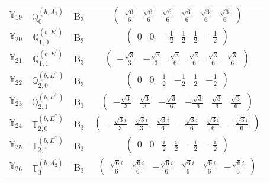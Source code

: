 \documentclass[fleqn,10pt,landscape]{article}
\begin{document}
\begin{itemize}
\begin{center}
\begin{longtable}{c|c|c|c}
$ \mathbb{Y}_{19} $ & $\mathbb{Q}_{0}^{(b,A_{1}^{\prime})}$ & B$_{3}$ & $\begin{pmatrix} \frac{\sqrt{6}}{6} & \frac{\sqrt{6}}{6} & \frac{\sqrt{6}}{6} & \frac{\sqrt{6}}{6} & \frac{\sqrt{6}}{6} & \frac{\sqrt{6}}{6} \end{pmatrix}$ \\
$ \mathbb{Y}_{20} $ & $\mathbb{Q}_{1,0}^{(b,E^{\prime})}$ & B$_{3}$ & $\begin{pmatrix} 0 & 0 & - \frac{1}{2} & \frac{1}{2} & \frac{1}{2} & - \frac{1}{2} \end{pmatrix}$ \\
$ \mathbb{Y}_{21} $ & $\mathbb{Q}_{1,1}^{(b,E^{\prime})}$ & B$_{3}$ & $\begin{pmatrix} - \frac{\sqrt{3}}{3} & - \frac{\sqrt{3}}{3} & \frac{\sqrt{3}}{6} & \frac{\sqrt{3}}{6} & \frac{\sqrt{3}}{6} & \frac{\sqrt{3}}{6} \end{pmatrix}$ \\
$ \mathbb{Y}_{22} $ & $\mathbb{Q}_{2,0}^{(b,E^{\prime\prime})}$ & B$_{3}$ & $\begin{pmatrix} 0 & 0 & \frac{1}{2} & - \frac{1}{2} & \frac{1}{2} & - \frac{1}{2} \end{pmatrix}$ \\
$ \mathbb{Y}_{23} $ & $\mathbb{Q}_{2,1}^{(b,E^{\prime\prime})}$ & B$_{3}$ & $\begin{pmatrix} - \frac{\sqrt{3}}{3} & \frac{\sqrt{3}}{3} & - \frac{\sqrt{3}}{6} & - \frac{\sqrt{3}}{6} & \frac{\sqrt{3}}{6} & \frac{\sqrt{3}}{6} \end{pmatrix}$ \\
$ \mathbb{Y}_{24} $ & $\mathbb{T}_{2,0}^{(b,E^{\prime\prime})}$ & B$_{3}$ & $\begin{pmatrix} - \frac{\sqrt{3} i}{3} & \frac{\sqrt{3} i}{3} & \frac{\sqrt{3} i}{6} & - \frac{\sqrt{3} i}{6} & \frac{\sqrt{3} i}{6} & - \frac{\sqrt{3} i}{6} \end{pmatrix}$ \\
$ \mathbb{Y}_{25} $ & $\mathbb{T}_{2,1}^{(b,E^{\prime\prime})}$ & B$_{3}$ & $\begin{pmatrix} 0 & 0 & \frac{i}{2} & \frac{i}{2} & - \frac{i}{2} & - \frac{i}{2} \end{pmatrix}$ \\
$ \mathbb{Y}_{26} $ & $\mathbb{T}_{3}^{(b,A_{2}^{\prime})}$ & B$_{3}$ & $\begin{pmatrix} \frac{\sqrt{6} i}{6} & \frac{\sqrt{6} i}{6} & - \frac{\sqrt{6} i}{6} & \frac{\sqrt{6} i}{6} & \frac{\sqrt{6} i}{6} & - \frac{\sqrt{6} i}{6} \end{pmatrix}$ \\

\end{longtable}
\end{center}
\end{itemize}
\end{document}
